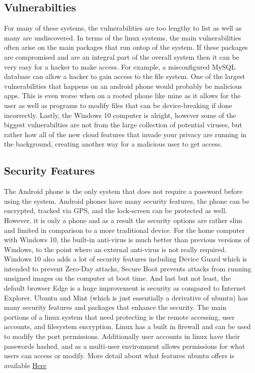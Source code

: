 \documentclass[a4paper, 11pt]{article}
\begin{document}
\subsection*{Vulnerabilties}
For many of these systems, the vulnerabilities are too lengthy to list as well as many are undiscovered.  In terms of the linux systems, the main vulnerabilities often arise on the main packages that run ontop of the system.  If these packages are compromised and are an integral part of the overall system then it can be very easy for a hacker to make access.  For example, a misconfigured MySQL database can allow a hacker to gain access to the file system.  One of the largest vulnerabilities that happens on an android phone would probably be malicious apps.  This is even worse when on a rooted phone like mine as it allows for the user as well as programs to modify files that can be device-breaking if done incorrectly.  Lastly, the Windows 10 computer is alright, however some of the biggest vulnerabilties are not from the large collection of potential viruses, but rather how all of the new cloud features that invade your privacy are running in the background, creating another way for a malicious user to get access.

\subsection*{Security Features}
The Android phone is the only system that does not require a password before using the system.  Android phones have many security features, the phone can be encrypted, tracked via GPS, and the lock-screen can be protected as well.  However, it is only a phone and as a result the security options are rather slim and limited in comparison to a more traditional device.   For the home computer with Windows 10, the built-in anti-virus is much better than previous versions of Windows, to the point where an external anti-virus is not really required.  Windows 10 also adds a lot of security features including Device Guard which is intended to prevent Zero-Day attacks, Secure Boot prevents attacks from running unsigned images on the computer at boot time.  And last but not least, the default browser Edge is a huge improvement is security as compared to Internet Explorer.  Ubuntu and Mint (which is just essentially a derivative of ubuntu) has many security features and packages that enhance the security.  The main portions of a linux system that need protecting is the remote accessing, user accounts, and filesystem encryption.  Linux has a built in firewall and can be used to modify the port permissions.  Additionally user accounts in linux have their passwords hashed, and as a multi-user environment allows permissions for what users can access or modify.  More detail about what features ubuntu offers is available \href{https://wiki.ubuntu.com/Security/Features}{Here}
\end{document}
